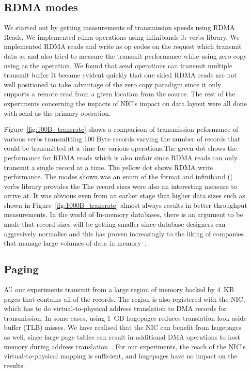 \subsection{RDMA modes}
We started out by getting measurements of transmission speeds using RDMA Reads.
We implemented rdma operations using infinibands ib verbs library. We implemented 
RDMA reads and write as op codes on the  request which 
transmit data as  and also tried to measure the transmit
performance while using zero copy using  as the operation.
We found that send operations can transmit multiple transmit buffer
It became evident quickly that one sided RDMA reads are not well positioned to 
take advantage of the zero copy paradigm since it only supports a remote read 
from a given location from the source. The rest of the experiments concerning
the impacts of NIC's impact on data layout were all done with send as the primary
operation. 


Figure~\ref{fig:100B_transrate} shows a comparison of transmission
peformance of various verbs transmitting 100 Byte records varying the number of records
that could be transmitted at a time for various operations.The green dot shows
the performance for RDMA reads which is also unfair
since RDMA reads can only transmit a single record at a time. The yellow dot
shows RDMA write performance. The modes shown was an enum of the format 
 and infiniband 
() verbs library provides the  The record sizes were 
also an interesting measure to arrive at. It was obvious even from an earlier stage
that higher data sizes such as shown in Figure~\ref{fig:1000B_transrate} almost 
always results in better throughput measurements. In the world of In-memory databases,
there is an argument to be made that record sizes will be getting smaller since 
database designers can aggresively normalise and this has proven increasingly to
the liking of companies that manage large volumes of data in memory~\cite{fb-memcache,fb-workload}.


\subsection{Paging}
All our experiments transmit from a large region of memory backed by 4~KB pages
that contains all of the records. The region is also
registered with the NIC, which has to do virtual-to-physical address
translation to DMA records for transmission.
In some cases, using 1~GB hugepages reduces translation look aside buffer
(TLB) misses. We have realised that the NIC can benefit from
hugepages as well, since large page tables can result in additional
DMA operations to host memory during address translation~\cite{farm,rdma}. For
our experiments, the reach of the NIC's virtual-to-physical mapping is
sufficient, and hugepages have no impact on the results.


